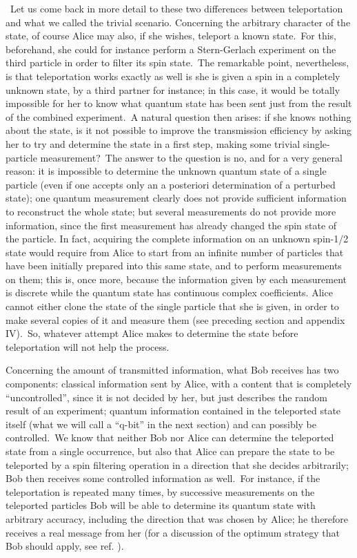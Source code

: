 \documentclass[12pt,onecolumn]{article}%
\begin{document}
\ Let us come back in more detail to these two differences between
teleportation and what we called the trivial scenario. Concerning the
arbitrary character of the state, of course Alice may also, if she wishes,
teleport a known state.\ For this, beforehand, she could for instance perform
a Stern-Gerlach experiment on the third particle in order to filter its spin
state.\ The remarkable point, nevertheless, is that teleportation works
exactly as well is she is given a spin in a completely unknown state, by a
third partner for instance; in this case, it would be totally impossible for
her to know what quantum state has been sent just from the result of the
combined experiment.\ A natural question then arises: if she knows nothing
about the state, is it not possible to improve the transmission efficiency by
asking her to try and determine the state in a first step, making some trivial
single-particle measurement?\ The answer to the question is no, and for a very
general reason: it is impossible to determine the unknown quantum state of a
single particle (even if one accepts only an a posteriori determination of a
perturbed state); one quantum measurement clearly does not provide sufficient
information to reconstruct the whole state; but several measurements do not
provide more information, since the first measurement has already changed the
spin state of the particle. In fact, acquiring the complete information on an
unknown spin-1/2 state would require from Alice to start from an infinite
number of particles that have been initially prepared into this same state,
and to perform measurements on them; this is, once more, because the
information given by each measurement is discrete while the quantum state has
continuous complex coefficients. Alice cannot either clone the state of the
single particle that she is given, in order to make several copies of it and
measure them (see preceding section and appendix IV).\ So, whatever attempt
Alice makes to determine the state before teleportation will not help the process.

Concerning the amount of transmitted information, what Bob receives has two
components: classical information sent by Alice, with a content that is
completely ``uncontrolled'', since it is not decided by her, but just
describes the random result of an experiment; quantum information contained in
the teleported state itself (what we will call a ``q-bit'' in the next
section) and can possibly be controlled.\ We know that neither Bob nor Alice
can determine the teleported state from a single occurrence, but also that
Alice can prepare the state to be teleported by a spin filtering operation in
a direction that she decides arbitrarily; Bob then receives some controlled
information as well.\ For instance, if the teleportation is repeated many
times, by successive measurements on the teleported particles Bob will be able
to determine its quantum state with arbitrary accuracy, including the
direction that was chosen by Alice; he therefore receives a real message from
her (for a discussion of the optimum strategy that Bob should apply, see ref.
\cite{Massar}).
\end{document}
